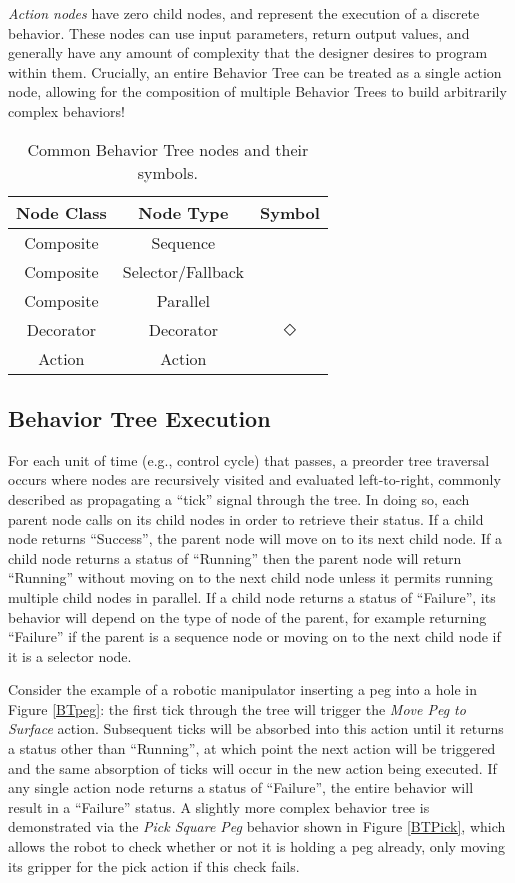 \emph{Action nodes} have zero child nodes, and represent the execution of a discrete behavior. These nodes can use input parameters, return output values, and generally have any amount of complexity that the designer desires to program within them. Crucially, an entire Behavior Tree can be treated as a single action node, allowing for the composition of multiple Behavior Trees to build arbitrarily complex behaviors!

\begin{table}[h!]
	\centering
	\begin{tabular}{ ||c c c|| }
		\hline
		\hline
		Node Class & Node Type & Symbol \\
		\hline
		Composite & Sequence & \fbox{$\rightarrow$} \\
		Composite & Selector/Fallback & \fbox{?} \\
		Composite & Parallel & \fbox{$\rightrightarrows$} \\
		Decorator & Decorator & $\Diamond$ \\
		Action & Action & \fbox{Text} \\
		\hline
		\hline
	\end{tabular}
	\caption{Common Behavior Tree nodes and their symbols.}
\end{table}

\subsection{Behavior Tree Execution}
For each unit of time (e.g., control cycle) that passes, a preorder tree traversal occurs where nodes are recursively visited and evaluated left-to-right, commonly described as propagating a ``tick'' signal through the tree. In doing so, each parent node calls on its child nodes in order to retrieve their status. If a child node returns ``Success'', the parent node will move on to its next child node. If a child node returns a status of ``Running'' then the parent node will return ``Running'' without moving on to the next child node unless it permits running multiple child nodes in parallel. If a child node returns a status of ``Failure'', its behavior will depend on the type of node of the parent, for example returning ``Failure'' if the parent is a sequence node or moving on to the next child node if it is a selector node. 

Consider the example of a robotic manipulator inserting a peg into a hole in Figure \ref{BTpeg}: the first tick through the tree will trigger the \emph{Move Peg to Surface} action. Subsequent ticks will be absorbed into this action until it returns a status other than ``Running'', at which point the next action will be triggered and the same absorption of ticks will occur in the new action being executed. If any single action node returns a status of ``Failure'', the entire behavior will result in a ``Failure'' status. A slightly more complex behavior tree is demonstrated via the \emph{Pick Square Peg} behavior shown in Figure \ref{BTPick}, which allows the robot to check whether or not it is holding a peg already, only moving its gripper for the pick action if this check fails.


